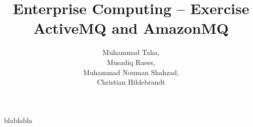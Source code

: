 \documentclass[bibtotocnumbered]{scrreprt}
\begin{document}
\pagestyle{scrheadings}
\chead[]{}
\cfoot{\pagemark}


\title{Enterprise Computing -- Exercise\\ActiveMQ and AmazonMQ}
\author{Muhammad Taha,\\Musadiq Raees,\\Muhammad Nouman Shahzad,\\Christian Hildebrandt}
\maketitle

 
blablabla
\end{document}
